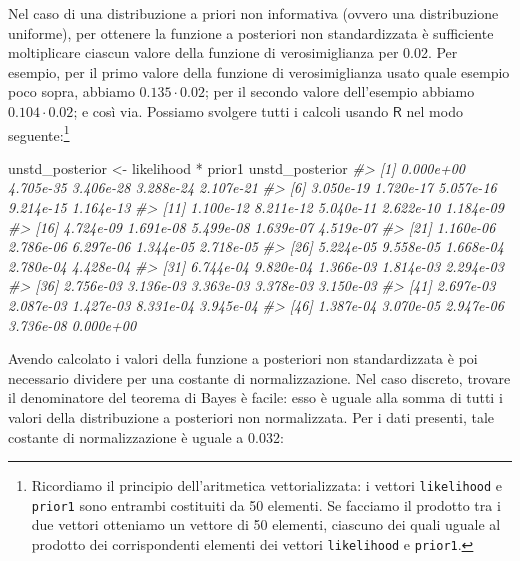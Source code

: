 \documentclass[
  11pt,
]{krantz}
\makeatletter
\newenvironment{Shaded}{\begin{snugshade}}{\end{snugshade}}
\newcommand{\CommentTok}[1]{\textcolor[rgb]{0.37,0.37,0.37}{\textit{#1}}}
\newcommand{\NormalTok}[1]{#1}
\newcommand{\OtherTok}[1]{\textcolor[rgb]{0.37,0.37,0.37}{#1}}
\newcommand{\SpecialCharTok}[1]{\textcolor[rgb]{0,0,0}{#1}}
\newenvironment{kframe}{%
\medskip{}
\setlength{\fboxsep}{.8em}
 \def\at@end@of@kframe{}%
 \ifinner\ifhmode%
  \def\at@end@of@kframe{\end{minipage}}%
  \begin{minipage}{\columnwidth}%
 \fi\fi%
 \def\FrameCommand##1{\hskip\@totalleftmargin \hskip-\fboxsep
 \colorbox{shadecolor}{##1}\hskip-\fboxsep
     \hskip-\linewidth \hskip-\@totalleftmargin \hskip\columnwidth}%
 \MakeFramed {\advance\hsize-\width
   \@totalleftmargin\z@ \linewidth\hsize
   \@setminipage}}%
 {\par\unskip\endMakeFramed%
 \at@end@of@kframe}
\renewenvironment{Shaded}{\begin{kframe}}{\end{kframe}}
\newcommand{\R}{\textsf{R}} %
\theoremstyle{definition}
\theoremstyle{definition}
\theoremstyle{definition}
\theoremstyle{definition}
\theoremstyle{remark}
\makeatother
\begin{document}
Nel caso di una distribuzione a priori non informativa (ovvero una distribuzione uniforme), per ottenere la funzione a posteriori non standardizzata è sufficiente moltiplicare ciascun valore della funzione di verosimiglianza per 0.02. Per esempio, per il primo valore della funzione di verosimiglianza usato quale esempio poco sopra, abbiamo \(0.135 \cdot 0.02\); per il secondo valore dell'esempio abbiamo \(0.104 \cdot 0.02\); e così via. Possiamo svolgere tutti i calcoli usando \(\R\) nel modo seguente:\footnote{Ricordiamo il principio dell'aritmetica vettorializzata: i vettori \texttt{likelihood} e \texttt{prior1} sono entrambi costituiti da 50 elementi. Se facciamo il prodotto tra i due vettori otteniamo un vettore di 50 elementi, ciascuno dei quali uguale al prodotto dei corrispondenti elementi dei vettori \texttt{likelihood} e \texttt{prior1}.}

\begin{Shaded}
\begin{Highlighting}[]
\NormalTok{unstd\_posterior }\OtherTok{\textless{}{-}}\NormalTok{ likelihood }\SpecialCharTok{*}\NormalTok{ prior1}
\NormalTok{unstd\_posterior}
\CommentTok{\#\textgreater{}  [1] 0.000e+00 4.705e{-}35 3.406e{-}28 3.288e{-}24 2.107e{-}21}
\CommentTok{\#\textgreater{}  [6] 3.050e{-}19 1.720e{-}17 5.057e{-}16 9.214e{-}15 1.164e{-}13}
\CommentTok{\#\textgreater{} [11] 1.100e{-}12 8.211e{-}12 5.040e{-}11 2.622e{-}10 1.184e{-}09}
\CommentTok{\#\textgreater{} [16] 4.724e{-}09 1.691e{-}08 5.499e{-}08 1.639e{-}07 4.519e{-}07}
\CommentTok{\#\textgreater{} [21] 1.160e{-}06 2.786e{-}06 6.297e{-}06 1.344e{-}05 2.718e{-}05}
\CommentTok{\#\textgreater{} [26] 5.224e{-}05 9.558e{-}05 1.668e{-}04 2.780e{-}04 4.428e{-}04}
\CommentTok{\#\textgreater{} [31] 6.744e{-}04 9.820e{-}04 1.366e{-}03 1.814e{-}03 2.294e{-}03}
\CommentTok{\#\textgreater{} [36] 2.756e{-}03 3.136e{-}03 3.363e{-}03 3.378e{-}03 3.150e{-}03}
\CommentTok{\#\textgreater{} [41] 2.697e{-}03 2.087e{-}03 1.427e{-}03 8.331e{-}04 3.945e{-}04}
\CommentTok{\#\textgreater{} [46] 1.387e{-}04 3.070e{-}05 2.947e{-}06 3.736e{-}08 0.000e+00}
\end{Highlighting}
\end{Shaded}

Avendo calcolato i valori della funzione a posteriori non standardizzata è poi necessario dividere per una costante di normalizzazione. Nel caso discreto, trovare il denominatore del teorema di Bayes è facile: esso è uguale alla somma di tutti i valori della distribuzione a posteriori non normalizzata. Per i dati presenti, tale costante di normalizzazione è uguale a 0.032:
\end{document}
